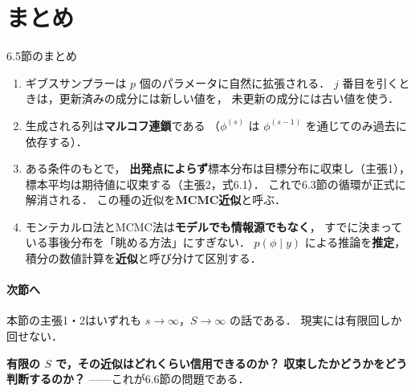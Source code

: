 \documentclass[lualatex,ja=standard,a4paper,12pt]{bxjsarticle}
\begin{document}
\section{まとめ}

\begin{thmbox}{6.5節のまとめ}
\begin{enumerate}
  \item ギブスサンプラーは $p$ 個のパラメータに自然に拡張される．
        $j$ 番目を引くときは，更新済みの成分には新しい値を，
        未更新の成分には古い値を使う．

  \item 生成される列は\textbf{マルコフ連鎖}である
        （$\phi^{(s)}$ は $\phi^{(s-1)}$ を通じてのみ過去に依存する）．

  \item ある条件のもとで，
        \textbf{出発点によらず}標本分布は目標分布に収束し（主張1），
        標本平均は期待値に収束する（主張2，式6.1）．
        これで6.3節の循環が正式に解消される．
        この種の近似を\textbf{MCMC近似}と呼ぶ．

  \item モンテカルロ法とMCMC法は\textbf{モデルでも情報源でもなく}，
        すでに決まっている事後分布を「眺める方法」にすぎない．
        $p(\phi\mid y)$ による推論を\textbf{推定}，
        積分の数値計算を\textbf{近似}と呼び分けて区別する．
\end{enumerate}
\end{thmbox}

\paragraph{次節へ}
本節の主張1・2はいずれも $s \to \infty$，$S \to \infty$ の話である．
現実には有限回しか回せない．

\medskip
\textbf{有限の $S$ で，その近似はどれくらい信用できるのか？}
\textbf{収束したかどうかをどう判断するのか？}
——これが6.6節の問題である．
\end{document}
